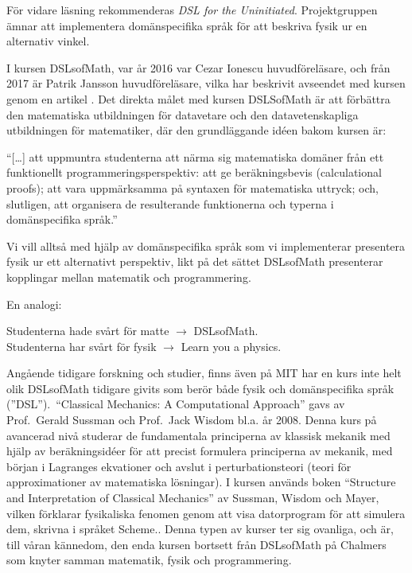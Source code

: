 \begin{draft}
För vidare läsning
rekommenderas \textit{DSL for the Uninitiated}.\cite{DSLU} Projektgruppen ämnar att implementera 
domänspecifika språk för att beskriva fysik ur en alternativ vinkel.

I kursen DSLsofMath, var år 2016 var Cezar Ionescu huvudföreläsare, och från 2017 är Patrik Jansson
huvudföreläsare, vilka har beskrivit avseendet med kursen genom en artikel \cite{tfpie2015}. Det direkta målet 
med kursen DSLSofMath är att förbättra den matematiska utbildningen för datavetare och den
datavetenskapliga utbildningen för matematiker, där den grundläggande idéen bakom kursen är: 

\begin{center}
  ``[\dots] att uppmuntra studenterna att närma sig matematiska domäner från ett
  funktionellt programmeringsperspektiv: att ge beräkningsbevis (calculational
  proofs); att vara uppmärksamma på syntaxen för matematiska uttryck; och,
  slutligen, att organisera de resulterande funktionerna och typerna i
  domänspecifika språk.''\cite{lecture-notes}\cite{tfpie2015} 
\end{center}

Vi vill alltså med hjälp av domänspecifika språk som vi implementerar presentera fysik ur ett alternativt perspektiv, likt
på det sättet DSLsofMath presenterar kopplingar mellan matematik och programmering.

En analogi:

Studenterna hade svårt för matte $\rightarrow $ DSLsofMath.\\
Studenterna har svårt för fysik $\rightarrow $ Learn you a physics.


Angående tidigare forskning och studier, finns även på MIT har en kurs inte helt olik DSLsofMath tidigare givits som berör både
fysik och domänspecifika språk (''DSL'').\ ``Classical Mechanics: A Computational Approach'' gavs av
Prof.\ Gerald Sussman och Prof.\ Jack Wisdom bl.a. år
2008.\cite{classical-mechanics-course-mit-2008}
Denna kurs på avancerad nivå studerar de fundamentala principerna av klassisk
mekanik med hjälp av beräkningsidéer för att precist formulera principerna av
mekanik, med början i Lagranges ekvationer och avslut i
perturbationsteori (teori för approximationer av matematiska lösningar). I kursen används boken ``Structure and %
Interpretation of Classical Mechanics'' av Sussman, Wisdom och Mayer,
vilken förklarar fysikaliska fenomen genom att visa datorprogram för att
simulera dem, skrivna i språket Scheme.\cite{SICM}. Denna typen av kurser ter sig ovanliga, och är, till våran kännedom, den enda kursen bortsett från DSLsofMath på Chalmers som knyter samman matematik, fysik och programmering.


\end{draft}
